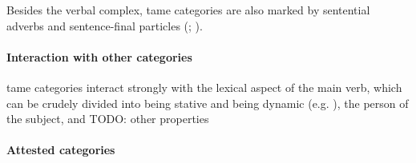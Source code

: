 \documentclass[a4paper, oneside, 12pt]{report}
\newcommand*{\citesec}[1]{\S~{#1}}
\newcommand*{\citepage}[1]{p.~{#1}}
\begin{document}
Besides the verbal complex, \acs{tame} categories are also marked by 
sentential adverbs and sentence-final particles 
(\citealt[\citepage{518}]{jacques2019egophoric}; \citealt[\citesec{21.8}]{jacques2021grammar}).

\paragraph*{Interaction with other categories}

\acs{tame} categories interact strongly with 
the lexical aspect of the main verb,
which can be crudely divided into being stative 
and being dynamic (e.g. \citealt[\citesec{21.3.1.2}]{jacques2021grammar}),
the person of the subject, and  TODO: other properties

\paragraph*{Attested categories}
\end{document}
